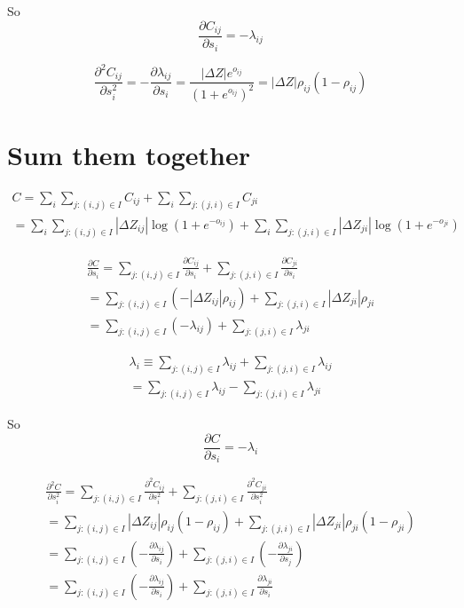 \documentclass [11pt,a4paper]{article}
\begin{document}
So
\begin{equation}
\frac{\partial C_{ij}}{\partial s_i}
= - \lambda_{ij}
\end{equation}


\begin{equation}
\frac{\partial^2 C_{ij}}{\partial s_i^2}
= -\frac{\partial \lambda_{ij}}{\partial s_i}
= \frac{|\Delta Z| e^{o_{ij}}}{(1+e^{o_{ij}})^2}
= |\Delta Z| \rho_{ij} (1 - \rho_{ij})
\end{equation}


\section{Sum them together}
\begin{eqnarray}
C = \sum_{i} \sum_{j:(i,j) \in I} C_{ij}
+ \sum_{i} \sum_{j:(j,i) \in I} C_{ji} \\
\label{C}
= \sum_{i} \sum_{j:(i,j) \in I} |\Delta Z_{ij}| \log(1+e^{-o_{ij}})
+ \sum_{i} \sum_{j:(j,i) \in I} |\Delta Z_{ji}| \log(1+e^{-o_{ji}})
\end{eqnarray}


\begin{eqnarray}
\frac{\partial C}{\partial s_i}
= \sum_{j:(i,j) \in I} \frac{\partial C_{ij}}{\partial s_i}
+ \sum_{j:(j,i) \in I} \frac{\partial C_{ji}}{\partial s_i} \\
= \sum_{j:(i,j) \in I} (-|\Delta Z_{ij}| \rho_{ij})
+ \sum_{j:(j,i) \in I} |\Delta Z_{ji}| \rho_{ji} \\
= \sum_{j:(i,j) \in I} (-\lambda_{ij})
+ \sum_{j:(j,i) \in I} \lambda_{ji}
\end{eqnarray}


\begin{eqnarray}
\lambda_i
\equiv \sum_{j:(i,j)\in I} \lambda_{ij} + \sum_{j:(j,i)\in I} \lambda_{ij} \\
= \sum_{j:(i,j)\in I} \lambda_{ij} - \sum_{j:(j,i)\in I} \lambda_{ji}
\end{eqnarray}


So
\begin{equation}
\label{d}
\frac{\partial C}{\partial s_i}
= - \lambda_i
\end{equation}


\begin{eqnarray}
\frac{\partial^2 C}{\partial s_i^2}
= \sum_{j:(i,j) \in I} \frac{\partial^2 C_{ij}}{\partial s_i^2}
+ \sum_{j:(j,i) \in I} \frac{\partial^2 C_{ji}}{\partial s_i^2} \\
= \sum_{j:(i,j) \in I} |\Delta Z_{ij}| \rho_{ij} (1 - \rho_{ij})
+ \sum_{j:(j,i) \in I} |\Delta Z_{ji}| \rho_{ji} (1 - \rho_{ji}) \\
= \sum_{j:(i,j) \in I} (-\frac{\partial \lambda_{ij}}{\partial s_i})
+ \sum_{j:(j,i) \in I} (-\frac{\partial \lambda_{ji}}{\partial s_j}) \\
= \sum_{j:(i,j) \in I} (-\frac{\partial \lambda_{ij}}{\partial s_i})
+ \sum_{j:(j,i) \in I} \frac{\partial \lambda_{ji}}{\partial s_i}
\end{eqnarray}
\end{document}
